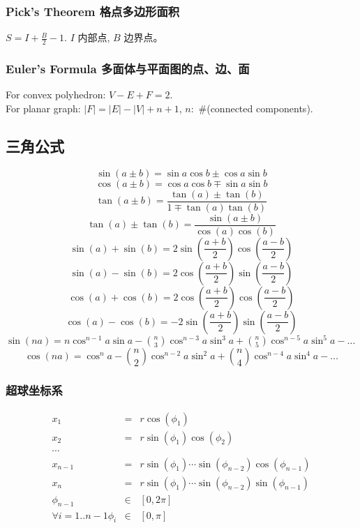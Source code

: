 \begin{small}
\begin{spacing}{0.5}
\subsubsection{Pick's Theorem 格点多边形面积}
$S=I+\frac{B}{2}-1.$ $I$ 内部点, $B$ 边界点。
\subsubsection{Euler's Formula 多面体与平面图的点、边、面}
For convex polyhedron: $V-E+F=2$. \\
For planar graph: $|F|=|E|-|V|+n+1$, $n:$ \#(connected components).
\subsection{三角公式}
\noindent
\[
\sin(a \pm b) = \sin a \cos b \pm \cos a \sin b
\]
\[
\cos(a \pm b) = \cos a \cos b \mp \sin a \sin b
\]
\[
\tan(a \pm b) = \frac{\tan(a)\pm\tan(b)}{1 \mp \tan(a)\tan(b)}
\]
\[
\tan(a) \pm \tan(b) = \frac{\sin(a \pm b)}{\cos(a)\cos(b)}
\]
\[
\sin(a) + \sin(b) = 2\sin(\frac{a + b}{2})\cos(\frac{a - b}{2})
\]
\[
\sin(a) - \sin(b) = 2\cos(\frac{a + b}{2})\sin(\frac{a - b}{2})
\]
\[
\cos(a) + \cos(b) = 2\cos(\frac{a + b}{2})\cos(\frac{a - b}{2})
\]
\[
\cos(a) - \cos(b) = -2\sin(\frac{a + b}{2})\sin(\frac{a - b}{2})
\]
$
\sin(na) = n\cos^{n-1}a\sin a - \binom{n}{3}\cos^{n-3}a \sin^3a + \binom{n}{5}\cos^{n-5}a\sin^5a - \dots
$
\[
\cos(na) = \cos^{n}a - \binom{n}{2}\cos^{n-2}a \sin^2a + \binom{n}{4}\cos^{n-4}a\sin^4a - \dots
\]
\subsubsection{超球坐标系}
\begin{eqnarray*}
        x_1 &=& r\cos(\phi_1) \\ 
    x_2 &=& r\sin(\phi_1)\cos(\phi_2) \\
    \cdots\\
    x_{n-1} &=& r\sin(\phi_1)\cdots\sin(\phi_{n-2})\cos(\phi_{n-1}) \\
    x_n &=& r\sin(\phi_1)\cdots\sin(\phi_{n-2})\sin(\phi_{n-1}) \\
    \phi_{n-1} &\in& [0,2\pi]\\
    \forall {i=1..{n-1}}\phi_i &\in& [0,\pi]\\
\end{eqnarray*}

\end{spacing}
\end{small}
